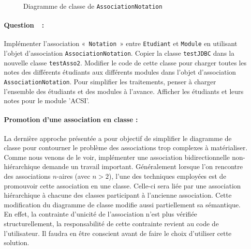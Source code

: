 \documentclass[a4paper,11pt]{article}
\newcounter{compteurQuestion}
\newcommand{\Question}{\paragraph*{Question~\thecompteurQuestion~:}\addtocounter{compteurQuestion}{1}}
\begin{document}
\begin{figure}\centering\footnotesize
{}
\caption{Diagramme de classe de \texttt{AssociationNotation}\label{classe_association_notation}}
\end{figure}

\Question Implémenter l'association «~\texttt{Notation}~» entre \texttt{Etudiant} et \texttt{Module} en utilisant  
l'objet d'association \texttt{AssociationNotation}.
Copier la classe \texttt{testJDBC} dans la nouvelle classe \texttt{testAsso2}.
Modifier le code de cette classe pour charger toutes les 
notes des différents étudiants aux différents modules dans l'objet d'association \texttt{AssociationNotation}. 
Pour simplifier les traitements, penser à charger l'ensemble des étudiants et des modules à l'avance.
Afficher les étudiants et leurs notes pour le module 'ACSI'.

\paragraph{Promotion d'une association en classe :}
La dernière approche présentée a pour objectif de simplifier le diagramme de classe pour contourner le problème 
des associations trop complexes à matérialiser. Comme nous venons de le voir, implémenter une association bidirectionnelle 
non-hiérarchique demande un travail important. Généralement lorsque l'on rencontre des associations $n$-aires (avec $n>2$),
l'une des techniques employées est de promouvoir cette association en une classe. Celle-ci sera liée par une association 
hiérarchique à chacune des classes participant à l'ancienne association. Cette modification du diagramme de classe modifie 
aussi partiellement sa sémantique. En effet, la contrainte d'unicité de l'association n'est plus vérifiée structurellement, 
la responsabilité de cette contrainte revient au code de l'utilisateur. Il faudra en être conscient 
avant de faire le choix d'utiliser cette solution.
\end{document}
